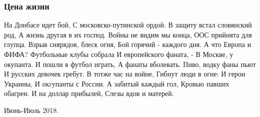  
 
 

\subsubsection{Цена жизни}

На Донбасе идет бой,
С московско-путинской ордой.
В защиту встал словянский род,
А жизнь другая в их господ.
Войны не видим мы конца,
ООС прийнята для глупца.
Взрыв снярядов, блеск огня,
Бой горячий - каждого дня.
А что Европа и ФИФА?
Футбольные клубы собрала
И европейского фаната, -
В Москве, у окупанта.
И пошли в футбол играть,
А фанаты вболевать.
Пиво, водку фаны пьют
И русских девочек гребут.
В тотже час на войне,
Гибнут люди в огне:
И герои Украины,
И окrупанты с России.
А забитый каждый гол,
Кровью павших обагрен.
И на доллар прибылей,
Слезы вдов и матерей.

Июнь-Июль 2018.
